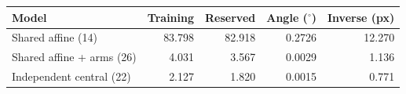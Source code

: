 \begin{tabular}{lrrrr}\toprule
Model & Training & Reserved & Angle ($^\circ$) & Inverse (px)\\\midrule
Shared affine (14) & 83.798 & 82.918 & 0.2726 & 12.270 \\
Shared affine + arms (26) & 4.031 & 3.567 & 0.0029 & 1.136 \\
Independent central (22) & 2.127 & 1.820 & 0.0015 & 0.771 \\
\bottomrule
\end{tabular}

